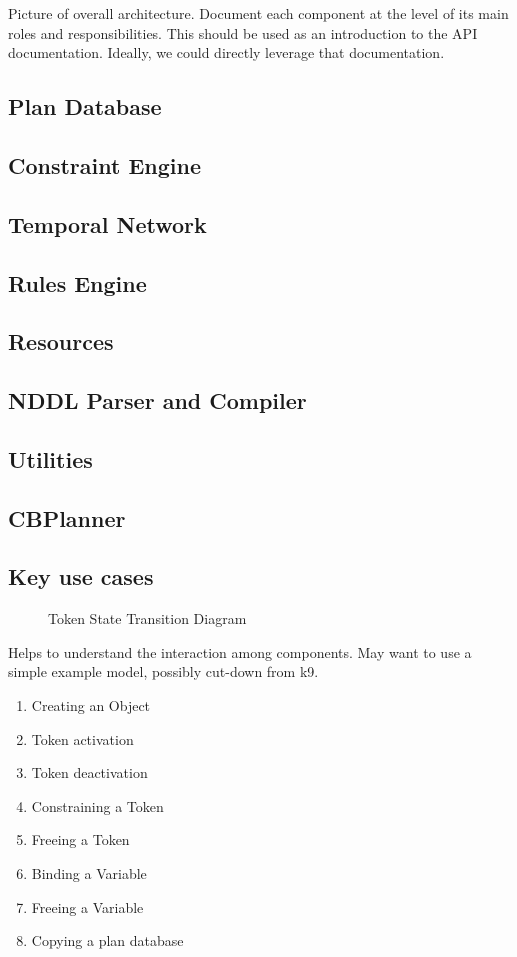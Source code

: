 \documentclass[10pt, letterpaper, twoside]{article}
\begin{document}
Picture of overall architecture. Document each component at the level of its main roles and responsibilities. This should be used as an introduction to the API documentation. Ideally, we could directly leverage that documentation.
\subsection{Plan Database}
\subsection{Constraint Engine}
\subsection{Temporal Network}
\subsection{Rules Engine}
\subsection{Resources}
\subsection{NDDL Parser and Compiler}
\subsection{Utilities}
\subsection{CBPlanner}
\subsection{Key use cases}


\begin{figure}[t]
\centering{}
\caption{Token State Transition Diagram}
\label{TokenStateModel}
\end{figure}


Helps to understand the interaction among components. May want to use a simple example model, possibly cut-down from k9.
\begin{enumerate}
\item Creating an Object
\item Token activation
\item Token deactivation
\item Constraining a Token
\item Freeing a Token
\item Binding a Variable
\item Freeing a Variable
\item Copying a plan database
\end{enumerate}
\end{document}
